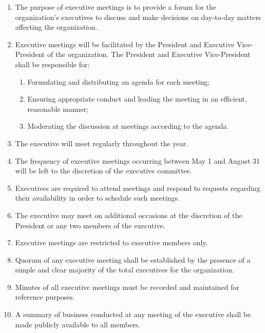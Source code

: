 \documentclass[12pt,a4paper]{article}
\begin{document}
\begin{enumerate}
\item The purpose of executive meetings is to provide a forum for the organization's executives to discuss and make decisions on day-to-day matters affecting the organization.

\item Executive meetings will be facilitated by the President and Executive Vice-President of the organization. The President and Executive Vice-President shall be responsible for:

\begin{enumerate}
\item Formulating and distributing an agenda for each meeting;

\item Ensuring appropriate conduct and leading the meeting in an efficient, reasonable manner;

\item Moderating the discussion at meetings according to the agenda.
\end{enumerate}

\item The executive will meet regularly throughout the year.

\item The frequency of executive meetings occurring between May 1 and August 31 will be left to the discretion of the executive committee.

\item Executives are required to attend meetings and respond to requests regarding their availability in order to schedule such meetings.

\item The executive may meet on additional occasions at the discretion of the President or any two members of the executive.

\item Executive meetings are restricted to executive members only.

\item Quorum of any executive meeting shall be established by the presence of a simple and clear majority of the total executives for the organization.

\item Minutes of all executive meetings must be recorded and maintained for reference purposes.

\item A summary of business conducted at any meeting of the executive shall be made publicly available to all members.


\end{enumerate}
\end{document}
